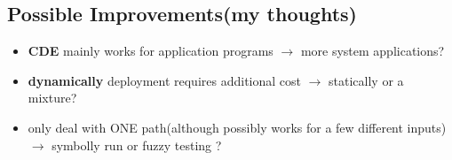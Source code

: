 \documentclass{report}
\begin{document}
\subsection{Possible Improvements(my thoughts)}
\label{sec:poss-impr}

\begin{itemize}
\item \textbf{CDE} mainly works for application programs $\rightarrow$ more
  system applications?
\item \textbf{dynamically} deployment requires additional cost $\rightarrow$
  statically or a mixture?
\item only deal with ONE path(although possibly works for a few different
  inputs) $\rightarrow$ symbolly run or fuzzy testing ?
\end{itemize}
\end{document}

